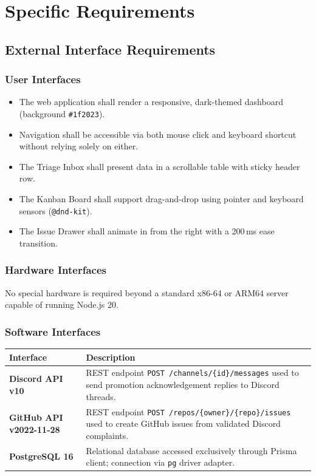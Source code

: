 \documentclass[12pt,a4paper]{report}
\begin{document}
\chapter{Specific Requirements}

\section{External Interface Requirements}

\subsection{User Interfaces}
\begin{itemize}
  \item The web application shall render a responsive, dark-themed dashboard
    (background \texttt{\#1f2023}).
  \item Navigation shall be accessible via both mouse click and keyboard
    shortcut without relying solely on either.
  \item The Triage Inbox shall present data in a scrollable table with sticky
    header row.
  \item The Kanban Board shall support drag-and-drop using pointer and keyboard
    sensors (\texttt{@dnd-kit}).
  \item The Issue Drawer shall animate in from the right with a 200\,ms ease
    transition.
\end{itemize}

\subsection{Hardware Interfaces}
No special hardware is required beyond a standard x86-64 or ARM64 server
capable of running Node.js 20.

\subsection{Software Interfaces}
\begin{longtable}{>{\bfseries}p{3.5cm} p{9cm}}
\toprule
Interface & Description \\
\midrule
\endhead
Discord API v10 & REST endpoint \texttt{POST /channels/\{id\}/messages} used to
  send promotion acknowledgement replies to Discord threads. \\
GitHub API v2022-11-28 & REST endpoint \texttt{POST /repos/\{owner\}/\{repo\}/issues}
  used to create GitHub issues from validated Discord complaints. \\
PostgreSQL 16 & Relational database accessed exclusively through Prisma client;
  connection via \texttt{pg} driver adapter. \\
\bottomrule
\end{longtable}
\end{document}
